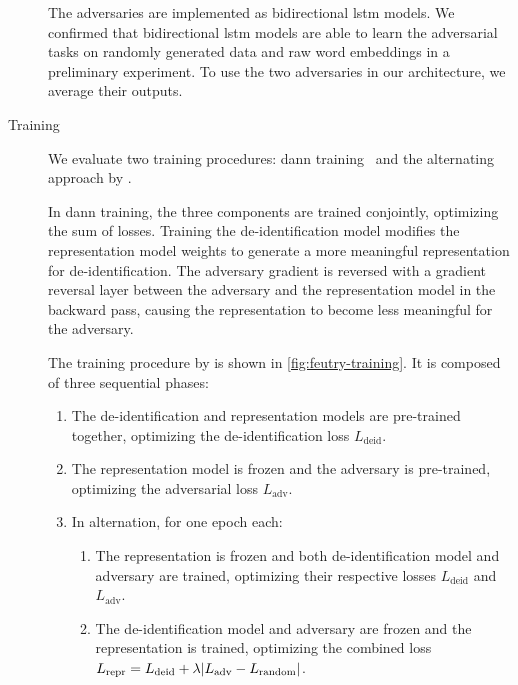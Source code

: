\begin{description}
    The adversaries are implemented as bidirectional \ac{lstm} models.
    We confirmed that bidirectional \ac{lstm} models are able to learn the adversarial tasks on randomly generated data and raw word embeddings in a preliminary experiment.
    To use the two adversaries in our architecture, we average their outputs.
    
    \item[Training]
    We evaluate two training procedures: \ac{dann} training~\citep{ganin2016domain} and the alternating approach by \citet{feutry2018learning}.
    
    In \ac{dann} training, the three components are trained conjointly, optimizing the sum of losses.
    Training the de-identification model modifies the representation model weights to generate a more meaningful representation for de-identification.
    The adversary gradient is reversed with a gradient reversal layer between the adversary and the representation model in the backward pass, causing the representation to become less meaningful for the adversary.
    
    The training procedure by \citet{feutry2018learning} is shown in \cref{fig:feutry-training}.
    It is composed of three sequential phases:
    \begin{enumerate}
        \item The de-identification and representation models are pre-trained together, optimizing the de-identification loss $L_{\text{deid}}$.
        \item The representation model is frozen and the adversary is pre-trained, optimizing the adversarial loss $L_{\text{adv}}$.
        \item In alternation, for one epoch each:
        \begin{enumerate}
            \item The representation is frozen and both de-identification model and adversary are trained, optimizing their respective losses $L_{\text{deid}}$ and $L_{\text{adv}}$.
            \item The de-identification model and adversary are frozen and the representation is trained, optimizing the combined loss $L_{\text{repr}} = L_{\text{deid}} + \lambda \lvert L_{\text{adv}} - L_{\text{random}}\rvert$. \label{item:repr-training}
        \end{enumerate}
    \end{enumerate}
    

\end{description}
